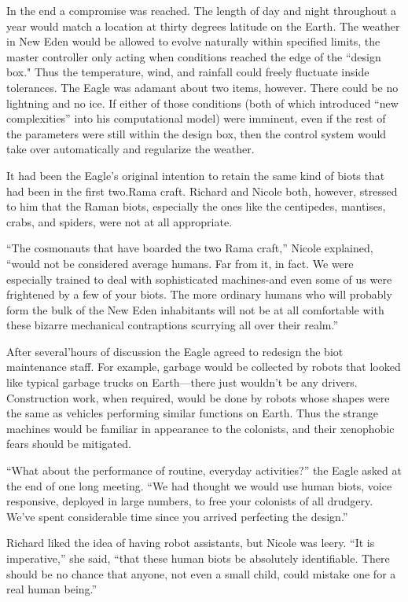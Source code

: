 \documentclass[]{article}
\begin{document}
{In the end a compromise was reached.  The length of day and night throughout a year would match a location at thirty degrees latitude on the Earth.  The weather in New Eden would be allowed to evolve naturally within specified limits, the master controller only acting when conditions reached the edge of the “design box."  Thus the temperature, wind, and rainfall could freely fluctuate inside tolerances.  The Eagle was adamant about two items, however.  There could be no lightning and no ice.  If either of those conditions (both of which introduced “new complexities” into his computational model) were imminent, even if the rest of the parameters were still within the design box, then the control system would take over automatically and regularize the weather.

It had been the Eagle’s original intention to retain the same kind of biots that had been in the first two.Rama craft.  Richard and Nicole both, however, stressed to him that the Raman biots, especially the ones like the centipedes, mantises, crabs, and spiders, were not at all appropriate.

“The cosmonauts that have boarded the two Rama craft,” Nicole explained, “would not be considered average humans.  Far from it, in fact.  We were especially trained to deal with sophisticated machines-and even some of us were frightened by a few of your biots.  The more ordinary humans who will probably form the bulk of the New Eden inhabitants will not be at all comfortable with these bizarre mechanical contraptions scurrying all over their realm.”

After several’hours of discussion the Eagle agreed to redesign the biot maintenance staff.  For example, garbage would be collected by robots that looked like typical garbage trucks on Earth—there just wouldn’t be any drivers.  Construction work, when required, would be done by robots whose shapes were the same as vehicles performing similar functions on Earth.  Thus the strange machines would be familiar in appearance to the colonists, and their xenophobic fears should be mitigated.

“What about the performance of routine, everyday activities?” the Eagle asked at the end of one long meeting.  “We had thought we would use human biots, voice responsive, deployed in large numbers, to free your colonists of all drudgery.  We’ve spent considerable time since you arrived perfecting the design.”

Richard liked the idea of having robot assistants, but Nicole was leery.  “It is imperative,” she said, “that these human biots be absolutely identifiable.  There should be no chance that anyone, not even a small child, could mistake one for a real human being.”

}
\end{document}
